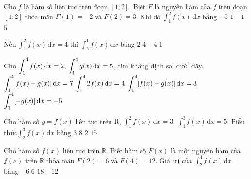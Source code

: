 \begin{ex}%
	Cho $f$ là hàm số liên tục trên đoạn $[1;2]$. Biết $F$ là nguyên hàm của $f$ trên đoạn $[1;2]$ thỏa mãn $F(1)=-2$ và $F(2)=3$. Khi đó $\displaystyle\int_{1}^{2} f(x)\mathrm{\,d}x$  bằng
	\choice 
		 {$-5$}
		 {$1$}
		{$-1$} 
		{\True $5$} 
\end{ex}

\begin{ex}%
	Nếu $\displaystyle\int_1^2 f(x)\mathrm{\,d}x = 4$  thì $\displaystyle\int_2^1 f(x)\mathrm{\,d}x$ bằng
	\choice 
		 {$2$}
		{$4$} 
		{\True  $-4$}
		{$1$} 
\end{ex}

\begin{ex}%
	Cho $\displaystyle\displaystyle\int_{1}^{4} f(x) \mathrm{\,d} x=2$,  $\displaystyle\displaystyle\int_{1}^{4} g(x) \mathrm{\,d} x=5$, tìm khẳng định sai dưới đây.
	\choice 
		{$\displaystyle\displaystyle\int_{1}^{4}[f(x)+g(x)] \mathrm{\,d} x=7$} 
		{$\displaystyle\displaystyle\int_{1}^{4} 2 f(x)  \mathrm{\,d} x=4$}
		{\True $\displaystyle\displaystyle\int_{1}^{4}[f(x)-g(x)]  \mathrm{\,d} x=3$}
		{$\displaystyle\displaystyle\int_{1}^{4}[-g(x)] \mathrm{\,d}  x=-5$}
\end{ex}

\begin{ex}%
	Cho hàm số $y=f(x)$ liên tục trên $\mathrm{R}$, $\displaystyle\int_1^2 f(x)\mathrm{\,d}x =3$, $\displaystyle\int_1^3 f(x)\mathrm{\,d}x =5$.  Biểu thức$\displaystyle\int_2^3 f(x)\mathrm{\,d}x$ bằng
	\choice 
		{$3$} 
		 {$8$}
		 {\True$2$}
		 {$15$}
\end{ex}

\begin{ex}%
	Cho hàm số $f(x)$ liên tục trên $\mathbb{R}$. Biết hàm số $F(x)$ là một nguyên hàm của $f(x)$ trên $\mathbb{R}$ thỏa mãn $F(2)=6$  và $F(4)=12$. Giá trị của $\displaystyle\int_2^4 f(x)\mathrm{\,d}x$ bằng
	\choice 
		 {$ -6 $}
		 {\True $ 6 $}
		{$ 18 $} 
		 {$ -12 $}
\end{ex}

